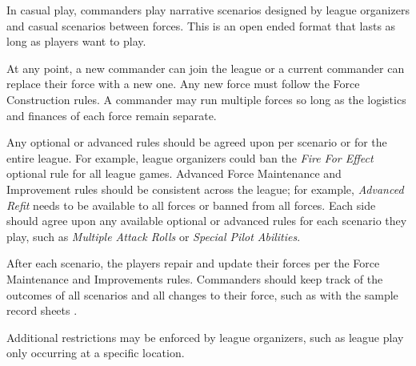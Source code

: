 In casual play, commanders play narrative scenarios designed by league organizers and casual scenarios between forces.
This is an open ended format that lasts as long as players want to play.

At any point, a new commander can join the league or a current commander can replace their force with a new one.
Any new force must follow the Force Construction rules.
A commander may run multiple forces so long as the logistics and finances of each force remain separate.

Any optional or advanced rules should be agreed upon per scenario or for the entire league.
For example, league organizers could ban the \emph{Fire For Effect} optional rule for all league games.
Advanced Force Maintenance and Improvement rules should be consistent across the league; for example, \emph{Advanced Refit} needs to be available to all forces or banned from all forces.
Each side should agree upon any available optional or advanced rules for each scenario they play, such as \emph{Multiple Attack Rolls} or \emph{Special Pilot Abilities}.

After each scenario, the players repair and update their forces per the Force Maintenance and Improvements rules.
Commanders should keep track of the outcomes of all scenarios and all changes to their force, such as with the sample record sheets .

Additional restrictions may be enforced by league organizers, such as league play only occurring at a specific location.
